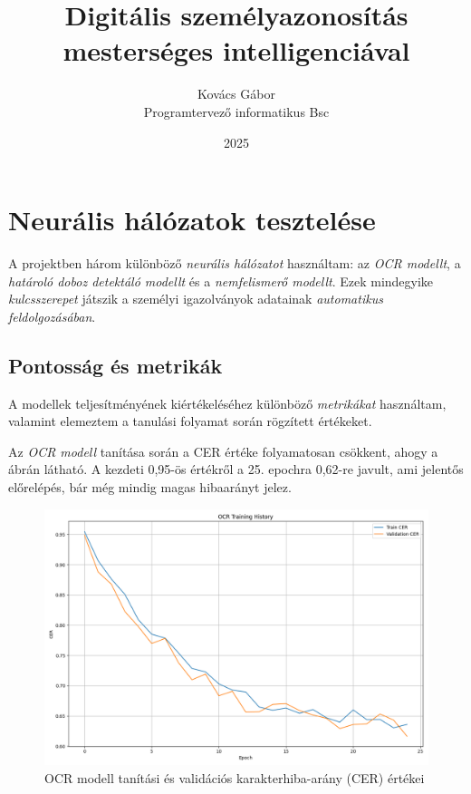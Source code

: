 \documentclass[
]{thesis-ekf}
\theoremstyle{definition}
\theoremstyle{remark}
\begin{document}
	
	\title{Digitális személyazonosítás mesterséges intelligenciával}
	\author{Kovács Gábor\\Programtervező informatikus Bsc}
	\date{2025}
	\maketitle
	
	\tableofcontents

\section{Neurális hálózatok tesztelése} A projektben három különböző \emph{neurális hálózatot} használtam: az \emph{OCR modellt}, a \emph{határoló doboz detektáló modellt} és a \emph{nemfelismerő modellt}. Ezek mindegyike \emph{kulcsszerepet} játszik a személyi igazolványok adatainak \emph{automatikus feldolgozásában}.

\subsection{Pontosság és metrikák} A modellek teljesítményének kiértékeléséhez különböző \emph{metrikákat} használtam, valamint elemeztem a tanulási folyamat során rögzített értékeket.

Az \emph{OCR modell} tanítása során a CER értéke folyamatosan csökkent, ahogy a  ábrán látható. A kezdeti 0,95-ös értékről a 25. epochra 0,62-re javult, ami jelentős előrelépés, bár még mindig magas hibaarányt jelez.

\begin{figure} \centering \includegraphics[width=\textwidth]{ocr_training_history} \caption{OCR modell tanítási és validációs karakterhiba-arány (CER) értékei} \label{fig-ocr-training} \end{figure}
\end{document}
